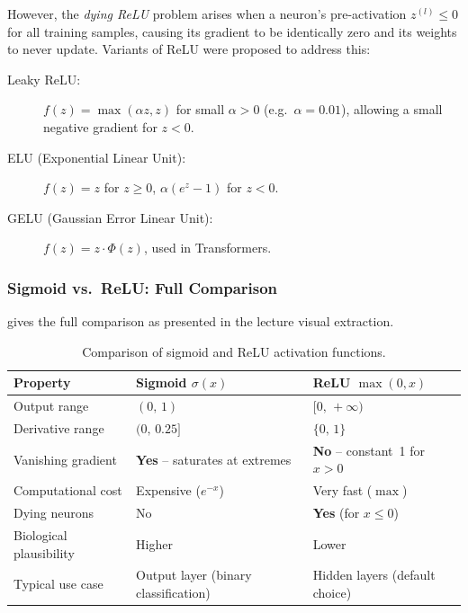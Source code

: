 \documentclass[12pt,a4paper]{article}
\begin{document}
However, the \emph{dying ReLU} problem arises when a neuron's
pre-activation $z^{(l)} \leq 0$ for all training samples, causing its
gradient to be identically zero and its weights to never update.
Variants of ReLU were proposed to address this:

\begin{description}
  \item[Leaky ReLU:] $f(z) = \max(\alpha z, z)$ for small
        $\alpha > 0$ (e.g.\ $\alpha = 0.01$), allowing a small negative
        gradient for $z < 0$.
  \item[ELU (Exponential Linear Unit):] $f(z) = z$ for $z \geq 0$,
        $\alpha(e^z - 1)$ for $z < 0$.
  \item[GELU (Gaussian Error Linear Unit):] $f(z) = z \cdot
        \Phi(z)$, used in Transformers.
\end{description}

\subsubsection{Sigmoid vs.\ ReLU: Full Comparison}
\label{subsubsec:sig_relu_comparison}

 gives the full comparison as presented in the
lecture visual extraction.

\begin{table}[htbp]
\centering
\caption{Comparison of sigmoid and ReLU activation functions.}
\label{tab:sig_vs_relu}
\begin{tabular}{@{}lll@{}}
\toprule
\textbf{Property}
  & \textbf{Sigmoid $\sigma(x)$}
  & \textbf{ReLU $\max(0,x)$} \\
\midrule
Output range    & $(0,\,1)$   & $[0,\,+\infty)$ \\
Derivative range & $(0,\,0.25]$ & $\{0,\,1\}$ \\
Vanishing gradient & \textbf{Yes} -- saturates at extremes
                   & \textbf{No} -- constant~1 for $x>0$ \\
Computational cost & Expensive ($e^{-x}$) & Very fast ($\max$) \\
Dying neurons      & No & \textbf{Yes} (for $x \leq 0$) \\
Biological plausibility & Higher & Lower \\
Typical use case  & Output layer (binary classification)
                  & Hidden layers (default choice) \\
\bottomrule
\end{tabular}
\end{table}
\end{document}
